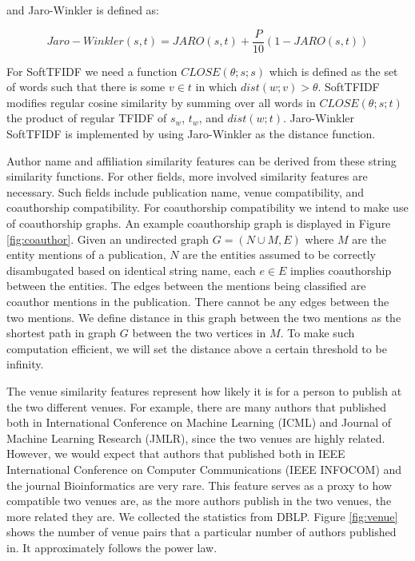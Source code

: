 \documentclass[twocolumn,letterpaper]{article}
\begin{document}
and Jaro-Winkler is defined as:
\begin{center}
\[
	Jaro-Winkler(s,t) = JARO(s,t) + \frac{P}{10}(1-JARO(s,t))
\]
\end{center}

For SoftTFIDF we need a function $CLOSE(\theta; s; s)$ which is defined as the set of words such that there is some $v \in t$ in which $dist(w; v) > \theta$. SoftTFIDF modifies regular cosine similarity by summing over all words in $CLOSE(\theta; s; t)$ the product of regular TFIDF of $s_w$, $t_w$, and $dist(w;t)$. Jaro-Winkler SoftTFIDF is implemented by using Jaro-Winkler as the distance function.

Author name and affiliation similarity features can be derived from these string similarity functions. For other fields, more involved similarity features are necessary. Such fields include publication name, venue compatibility, and coauthorship compatibility.  For coauthorship compatibility we intend to make use of coauthorship graphs. An example coauthorship graph is displayed in Figure \ref{fig:coauthor}. Given an undirected graph $G=(N \cup M,E)$ where $M$ are the entity mentions of a publication, $N$ are the entities assumed to be correctly disambugated based on identical string name, each $e \in E$ implies coauthorship between the entities. The edges between the mentions being classified are coauthor mentions in the publication. There cannot be any edges between the two mentions. We define distance in this graph between the two mentions as the shortest path in graph $G$ between the two vertices in $M$. To make such computation efficient, we will set the distance above a certain threshold to be infinity.

The venue similarity features represent how likely it is for a person to publish at the two different venues.  For example, there are many authors that published both in International Conference on Machine Learning (ICML) and Journal of Machine Learning Research (JMLR), since the two venues are highly related.  However, we would expect that authors that published both in IEEE International Conference on Computer Communications (IEEE INFOCOM) and the journal Bioinformatics are very rare.  This feature serves as a proxy to how compatible two venues are, as the more authors publish in the two venues, the more related they are.  We collected the statistics from DBLP.  Figure \ref{fig:venue} shows the number of venue pairs that a particular number of authors published in.  It approximately follows the power law.
\end{document}
